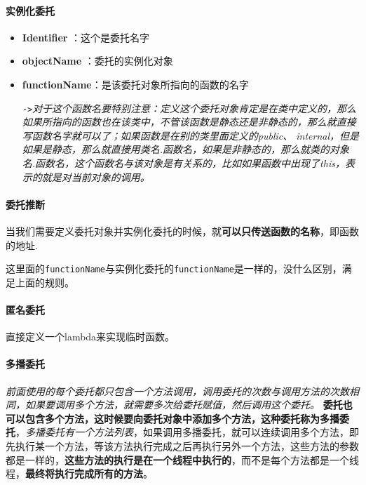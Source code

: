 \documentclass[UTF8,a4paper,12pt]{ctexbook}
\begin{document}
		 \paragraph{实例化委托} 
		 	  \begin{itemize}
		 	  	\item \textbf{Identifier} ：这个是委托名字
		 	  	\item \textbf{objectName} ：委托的实例化对象
		 	  	\item \textbf{functionName}：是该委托对象所指向的函数的名字
		 	  	
		 	  	 \verb|->|\textit{对于这个函数名要特别注意：定义这个委托对象肯定是在类中定义的，那么如果所指向的函数也在该类中，不管该函数是静态还是非静态的，那么就直接写函数名字就可以了；如果函数是在别的类里面定义的public、
		 	  	internal，但是如果是静态，那么就直接用类名.函数名，如果是非静态的，那么就类的对象名.函数名，这个函数名与该对象是有关系的，比如如果函数中出现了this，表示的就是对当前对象的调用。}
		 	  \end{itemize}
		 	 
		 \paragraph{委托推断}
		 
		 	当我们需要定义委托对象并实例化委托的时候，就\textbf{可以只传送函数的名称}，即函数的地址.
		 	
		 	这里面的\verb|functionName|与实例化委托的\verb|functionName|是一样的，没什么区别，满足上面的规则。
		 	
		 \paragraph{匿名委托} 
		 	
		 	直接定义一个lambda来实现临时函数。
		 	
		 \paragraph{多播委托} 
		 	
		 	\textit{前面使用的每个委托都只包含一个方法调用，调用委托的次数与调用方法的次数相同，如果要调用多个方法，就需要多次给委托赋值，然后调用这个委托。}
		 	\textbf{委托也可以包含多个方法，这时候要向委托对象中添加多个方法，这种委托称为多播委托}，\textit{多播委托有一个方法列表}，如果调用多播委托，就可以连续调用多个方法，即先执行某一个方法，等该方法执行完成之后再执行另外一个方法，这些方法的参数都是一样的，\textbf{这些方法的执行是在一个线程中执行的}，而不是每个方法都是一个线程，\textbf{最终将执行完成所有的方法}。
		 	
\end{document}
